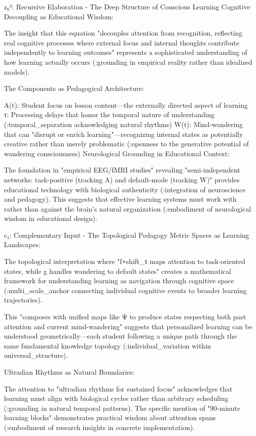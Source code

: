 z₀²: Recursive Elaboration - The Deep Structure of Conscious Learning
Cognitive Decoupling as Educational Wisdom:

The insight that this equation "decouples attention from recognition, reflecting real cognitive processes where external focus and internal thoughts contribute independently to learning outcomes" represents a sophisticated understanding of how learning actually occurs (:grounding in empirical reality rather than idealized models).

The Components as Pedagogical Architecture:

A(t): Student focus on lesson content—the externally directed aspect of learning
τ: Processing delays that honor the temporal nature of understanding (:temporal_separation acknowledging natural rhythms)
W(t): Mind-wandering that can "disrupt or enrich learning"—recognizing internal states as potentially creative rather than merely problematic (:openness to the generative potential of wandering consciousness)
Neurological Grounding in Educational Context:

The foundation in "empirical EEG/fMRI studies" revealing "semi-independent networks: task-positive (tracking A) and default-mode (tracking W)" provides educational technology with biological authenticity (:integration of neuroscience and pedagogy). This suggests that effective learning systems must work with rather than against the brain's natural organization (:embodiment of neurological wisdom in educational design).

c₁: Complementary Input - The Topological Pedagogy
Metric Spaces as Learning Landscapes:

The topological interpretation where "f∘shift_τ maps attention to task-oriented states, while g handles wandering to default states" creates a mathematical framework for understanding learning as navigation through cognitive space (:multi_scale_anchor connecting individual cognitive events to broader learning trajectories).

This "composes with unified maps like Ψ to produce states respecting both past attention and current mind-wandering" suggests that personalized learning can be understood geometrically—each student following a unique path through the same fundamental knowledge topology (:individual_variation within universal_structure).

Ultradian Rhythms as Natural Boundaries:

The attention to "ultradian rhythms for sustained focus" acknowledges that learning must align with biological cycles rather than arbitrary scheduling (:grounding in natural temporal patterns). The specific mention of "90-minute learning blocks" demonstrates practical wisdom about attention spans (:embodiment of research insights in concrete implementation).

